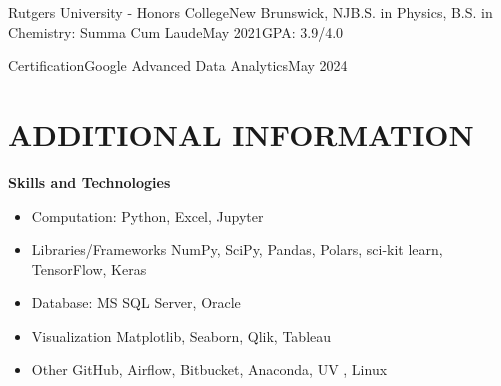 \documentclass[pdfauthor={Michael Tran},pdftitle={Michael Tran}]{resume}
\begin{document}
\begin{educationentry}{Rutgers University - Honors College}{New Brunswick, NJ}{B.S. in Physics, B.S. in Chemistry: Summa Cum Laude}{May 2021}{{GPA: 3.9/4.0}}
\end{educationentry}

\begin{educationentry}{Certification}{}{Google Advanced Data Analytics}{May 2024}{}
\end{educationentry}

\separator

\section{ADDITIONAL INFORMATION}

\textbf{Skills and Technologies}
\begin{itemize}
    \item Computation: Python, Excel, Jupyter
    \item Libraries/Frameworks NumPy, SciPy, Pandas, Polars, sci-kit learn, TensorFlow, Keras
    \item Database: MS SQL Server, Oracle
    \item Visualization Matplotlib, Seaborn, Qlik, Tableau
    \item Other GitHub, Airflow, Bitbucket, Anaconda, UV , Linux
\end{itemize}
\end{document}
